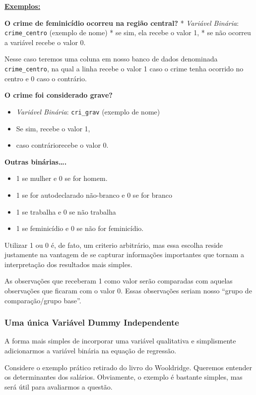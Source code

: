 \documentclass[
  letterpaper,
  DIV=11,
  numbers=noendperiod]{scrreprt}
\providecommand{\tightlist}{%
  \setlength{\itemsep}{0pt}\setlength{\parskip}{0pt}}
\begin{document}
\ul{\textbf{Exemplos:}}

\textbf{O crime de feminicídio ocorreu na região central?} *
\emph{Variável Binária}: \texttt{crime\_centro} (exemplo de nome) * se
sim, ela recebe o valor 1, * se não ocorreu a variável recebe o valor 0.

Nesse caso teremos uma coluna em nosso banco de dados denominada
\texttt{crime\_centro}, na qual a linha recebe o valor 1 caso o crime
tenha ocorrido no centro e 0 caso o contrário.

\textbf{O crime foi considerado grave?}

\begin{itemize}
\tightlist
\item
  \emph{Variável Binária}: \texttt{cri\_grav} (exemplo de nome)
\item
  Se sim, recebe o valor 1,
\item
  caso contráriorecebe o valor 0.
\end{itemize}

\textbf{Outras binárias\ldots.}

\begin{itemize}
\tightlist
\item
  1 se mulher e 0 se for homem.
\item
  1 se for autodeclarado não-branco e 0 se for branco
\item
  1 se trabalha e 0 se não trabalha
\item
  1 se feminicídio e 0 se não for feminicídio.
\end{itemize}

Utilizar 1 ou 0 é, de fato, um criterio arbitrário, mas essa escolha
reside justamente na vantagem de se capturar informações importantes que
tornam a interpretação dos resultados mais simples.

As observações que receberam 1 como valor serão comparadas com aquelas
observações que ficaram com o valor 0. Essas observações seriam nosso
``grupo de comparação/grupo base''.

\subsubsection{Uma única Variável Dummy
Independente}\label{uma-uxfanica-variuxe1vel-dummy-independente}

A forma mais simples de incorporar uma variável qualitativa e
simplismente adicionarmos a variável binária na equação de regressão.

Considere o exemplo prático retirado do livro do Wooldridge. Queremos
entender os determinantes dos salários. Obviamente, o exemplo é bastante
simples, mas será útil para avaliarmos a questão.
\end{document}
